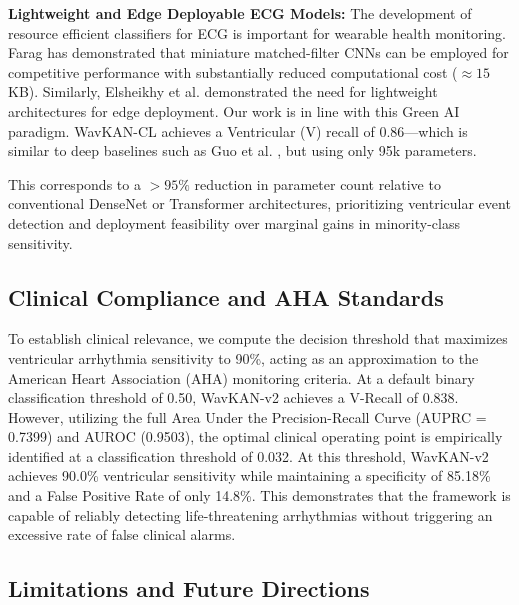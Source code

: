 \documentclass[journal,twoside,web]{ieeecolor}
\begin{document}
\textbf{Lightweight and Edge Deployable ECG Models:} The development of resource efficient classifiers for ECG is important for wearable health monitoring. Farag \cite{farag_tiny_2023} has demonstrated that miniature matched-filter CNNs can be employed for competitive performance with substantially reduced computational cost ($\approx 15$ KB). Similarly, Elsheikhy et al. \cite{elsheikhy_lightweight_2025} demonstrated the need for lightweight architectures for edge deployment. Our work is in line with this Green AI paradigm. WavKAN-CL achieves a Ventricular (V) recall of 0.86---which is similar to deep baselines such as Guo et al. \cite{guo_inter-patient_2019}, but using only 95k parameters.

This corresponds to a $> 95\%$ reduction in parameter count relative to conventional DenseNet or Transformer architectures, prioritizing ventricular event detection and deployment feasibility over marginal gains in minority-class sensitivity.

\subsection{Clinical Compliance and AHA Standards}

To establish clinical relevance, we compute the decision threshold that maximizes ventricular arrhythmia sensitivity to 90\%, acting as an approximation to the American Heart Association (AHA) monitoring criteria. At a default binary classification threshold of 0.50, WavKAN-v2 achieves a V-Recall of 0.838. However, utilizing the full Area Under the Precision-Recall Curve (AUPRC = 0.7399) and AUROC (0.9503), the optimal clinical operating point is empirically identified at a classification threshold of 0.032. At this threshold, WavKAN-v2 achieves 90.0\% ventricular sensitivity while maintaining a specificity of 85.18\% and a False Positive Rate of only 14.8\%. This demonstrates that the framework is capable of reliably detecting life-threatening arrhythmias without triggering an excessive rate of false clinical alarms.

\subsection{Limitations and Future Directions}
\end{document}
